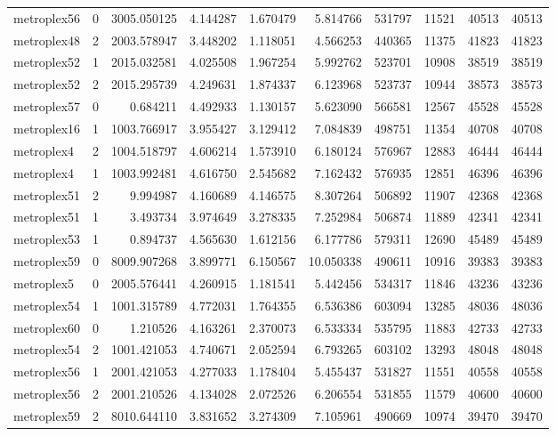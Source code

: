\documentclass[../../../thesis.tex]{subfiles}
\begin{document}
\begin{longtable}{|l|r|r|r|r|r|r|r|r|r|}
metroplex56 & 0 & 3005.050125 & 4.144287 & 1.670479 & 5.814766 & 531797 & 11521 & 40513 & 40513 \\
metroplex48 & 2 & 2003.578947 & 3.448202 & 1.118051 & 4.566253 & 440365 & 11375 & 41823 & 41823 \\
metroplex52 & 1 & 2015.032581 & 4.025508 & 1.967254 & 5.992762 & 523701 & 10908 & 38519 & 38519 \\
metroplex52 & 2 & 2015.295739 & 4.249631 & 1.874337 & 6.123968 & 523737 & 10944 & 38573 & 38573 \\
metroplex57 & 0 & 0.684211 & 4.492933 & 1.130157 & 5.623090 & 566581 & 12567 & 45528 & 45528 \\
metroplex16 & 1 & 1003.766917 & 3.955427 & 3.129412 & 7.084839 & 498751 & 11354 & 40708 & 40708 \\
metroplex4 & 2 & 1004.518797 & 4.606214 & 1.573910 & 6.180124 & 576967 & 12883 & 46444 & 46444 \\
metroplex4 & 1 & 1003.992481 & 4.616750 & 2.545682 & 7.162432 & 576935 & 12851 & 46396 & 46396 \\
metroplex51 & 2 & 9.994987 & 4.160689 & 4.146575 & 8.307264 & 506892 & 11907 & 42368 & 42368 \\
metroplex51 & 1 & 3.493734 & 3.974649 & 3.278335 & 7.252984 & 506874 & 11889 & 42341 & 42341 \\
metroplex53 & 1 & 0.894737 & 4.565630 & 1.612156 & 6.177786 & 579311 & 12690 & 45489 & 45489 \\
metroplex59 & 0 & 8009.907268 & 3.899771 & 6.150567 & 10.050338 & 490611 & 10916 & 39383 & 39383 \\
metroplex5 & 0 & 2005.576441 & 4.260915 & 1.181541 & 5.442456 & 534317 & 11846 & 43236 & 43236 \\
metroplex54 & 1 & 1001.315789 & 4.772031 & 1.764355 & 6.536386 & 603094 & 13285 & 48036 & 48036 \\
metroplex60 & 0 & 1.210526 & 4.163261 & 2.370073 & 6.533334 & 535795 & 11883 & 42733 & 42733 \\
metroplex54 & 2 & 1001.421053 & 4.740671 & 2.052594 & 6.793265 & 603102 & 13293 & 48048 & 48048 \\
metroplex56 & 1 & 2001.421053 & 4.277033 & 1.178404 & 5.455437 & 531827 & 11551 & 40558 & 40558 \\
metroplex56 & 2 & 2001.210526 & 4.134028 & 2.072526 & 6.206554 & 531855 & 11579 & 40600 & 40600 \\
metroplex59 & 2 & 8010.644110 & 3.831652 & 3.274309 & 7.105961 & 490669 & 10974 & 39470 & 39470 \\

\end{longtable}
\end{document}
